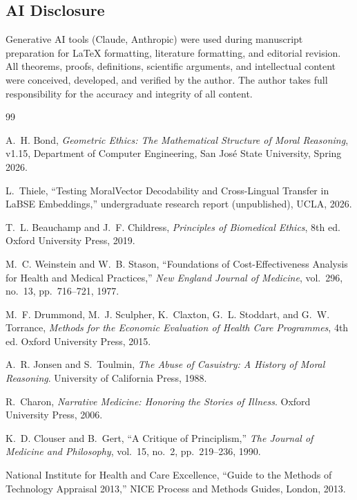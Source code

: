 \documentclass[12pt]{article}
\theoremstyle{definition}
\theoremstyle{remark}
\begin{document}
\subsection*{AI Disclosure}
Generative AI tools (Claude, Anthropic) were used during manuscript preparation for LaTeX formatting, literature formatting, and editorial revision.  All theorems, proofs, definitions, scientific arguments, and intellectual content were conceived, developed, and verified by the author.  The author takes full responsibility for the accuracy and integrity of all content.


\begin{thebibliography}{99}

A.~H. Bond, \emph{Geometric Ethics: The Mathematical Structure of Moral Reasoning}, v1.15, Department of Computer Engineering, San Jos\'{e} State University, Spring 2026.

L.~Thiele, ``Testing MoralVector Decodability and Cross-Lingual Transfer in LaBSE Embeddings,'' undergraduate research report (unpublished), UCLA, 2026.

T.~L. Beauchamp and J.~F. Childress, \emph{Principles of Biomedical Ethics}, 8th ed.  Oxford University Press, 2019.

M.~C. Weinstein and W.~B. Stason, ``Foundations of Cost-Effectiveness Analysis for Health and Medical Practices,'' \emph{New England Journal of Medicine}, vol.~296, no.~13, pp.~716--721, 1977.

M.~F. Drummond, M.~J. Sculpher, K.~Claxton, G.~L. Stoddart, and G.~W. Torrance, \emph{Methods for the Economic Evaluation of Health Care Programmes}, 4th ed.  Oxford University Press, 2015.

A.~R. Jonsen and S.~Toulmin, \emph{The Abuse of Casuistry: A History of Moral Reasoning}.  University of California Press, 1988.

R.~Charon, \emph{Narrative Medicine: Honoring the Stories of Illness}.  Oxford University Press, 2006.

K.~D. Clouser and B.~Gert, ``A Critique of Principlism,'' \emph{The Journal of Medicine and Philosophy}, vol.~15, no.~2, pp.~219--236, 1990.

National Institute for Health and Care Excellence, ``Guide to the Methods of Technology Appraisal 2013,'' NICE Process and Methods Guides, London, 2013.


\end{thebibliography}
\end{document}
